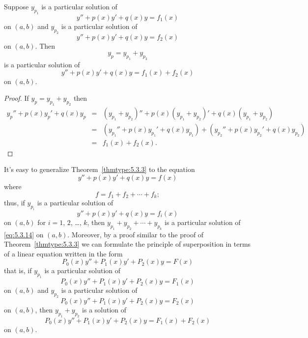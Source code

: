 \documentclass{ximera}
\begin{document}
\begin{theorem}
\label{thmtype:5.3.3} 
Suppose  $y_{p_1}$ is a particular solution of
$$
y''+p(x)y'+q(x)y=f_1(x)
$$
on $(a,b)$ and $y_{p_2}$ is a particular solution of
$$
y''+p(x)y'+q(x)y=f_2(x)
$$
on   $(a,b)$.
 Then
$$
y_p=y_{p_1}+y_{p_2}
$$
is a particular  solution of
$$
y''+p(x)y'+q(x)y=f_1(x)+f_2(x)
$$
on  $(a,b)$.
\end{theorem}

\begin{proof} If $y_p=y_{p_1}+y_{p_2}$ then
\begin{eqnarray*}
y_p''+p(x)y_p'+q(x)y_p&=&(y_{p_1}+y_{p_2})''+p(x)(y_{p_1}+y_{p_2})'
+q(x)(y_{p_1}+y_{p_2})\\
&=&\left(y_{p_1}''+p(x)y_{p_1}'+q(x)y_{p_1}\right)
+\left(y_{p_2}''+p(x)y_{p_2}'+q(x)y_{p_2}\right)\\
&=&f_1(x)+f_2(x).
\end{eqnarray*}
\end{proof}


It's easy to generalize  Theorem~\ref{thmtype:5.3.3}
to the equation
\begin{equation} \label{eq:5.3.14}
y''+p(x)y'+q(x)y=f(x)
\end{equation}
where
$$
f=f_1+f_2+\cdots+f_k;
$$
thus, if $y_{p_i}$ is a particular solution of
$$
y''+p(x)y'+q(x)y=f_i(x)
$$
on $(a,b)$ for $i=1$, $2$, \dots, $k$, then
$y_{p_1}+y_{p_2}+\cdots+y_{p_k}$
is a particular solution of \eqref{eq:5.3.14} on $(a,b)$. Moreover, by a
proof similar to the proof of Theorem~\ref{thmtype:5.3.3} we can formulate
the principle of superposition in terms of a linear equation written
in the form
$$
P_0(x)y''+P_1(x)y'+P_2(x)y=F(x)
$$
   that is, if $y_{p_1}$
is a particular solution of
$$
P_0(x)y''+P_1(x)y'+P_2(x)y=F_1(x)
$$
on $(a,b)$ and $y_{p_2}$ is a particular solution of
$$
P_0(x)y''+P_1(x)y'+P_2(x)y=F_2(x)
$$
on  $(a,b)$, then $y_{p_1}+y_{p_2}$ is a solution of
$$
P_0(x)y''+P_1(x)y'+P_2(x)y=F_1(x)+F_2(x)
$$
on $(a,b)$.
\end{document}

